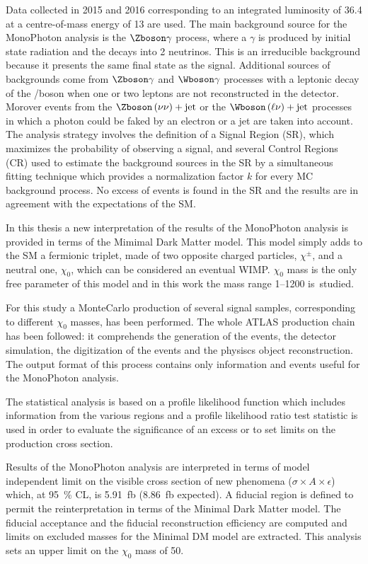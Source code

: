 \documentclass[a4paper,11pt]{article}
\newcommand{\mph}{MonoPhoton }
\newcommand{\cm}{centre-of-mass }
\newcommand{\chizero}{$\chi_0$ }
\begin{document}
Data collected in 2015 and 2016 corresponding to an integrated luminosity of \SI{36.4}{\ifb} at a \cm energy of \SI{13}{\tev} are used. The main background source for the \mph analysis is the $\Zboson\gamma$ process, where a $\gamma$ is produced by initial state radiation and the \Zboson decays into 2 neutrinos. This is an irreducible background because it presents the same final state as the signal. Additional sources of backgrounds come from $\Zboson\gamma$ and $\Wboson\gamma$ processes with a leptonic decay of the \Zboson/\Wboson boson when one or two leptons are not reconstructed in the detector. Morover events from the $\Zboson\left(\nu\nu\right)+\text{jet}$ or the $\Wboson\left(\ell\nu\right)+\text{jet}$ processes in which a photon could be faked by an electron or a jet are taken into account. The analysis strategy involves the definition of a Signal Region (SR), which maximizes the probability of observing a signal, and several Control Regions (CR) used to estimate the background sources in the SR by a simultaneous fitting technique which provides a normalization factor $k$ for every MC background process. No excess of events is found in the SR and the results are in agreement with the expectations of the SM.

In this thesis a new interpretation of the results of the \mph analysis is provided in terms of the Mimimal Dark Matter model. This model simply adds to the SM a fermionic triplet, made of two opposite charged particles, $\chi^\pm$, and a neutral one, $\chi_0$, which can be considered an eventual WIMP. \chizero mass is the only free parameter of this model and in this work the mass range \SIrange{1}{1200}{\gev} \mbox{is studied}.

  
For this study a MonteCarlo production of several signal samples, \mbox{corresponding} to different \chizero masses, has been performed. The whole ATLAS production chain has been followed: it comprehends the generation of the events, the detector simulation, the digitization of the events and the physiscs object reconstruction. The output format of this process contains only information and events useful for the \mph analysis. 

The statistical analysis is based on a profile likelihood function which includes information from the various regions and a profile likelihood ratio test statistic is used in order to evaluate the significance of an excess or to set limits on the production cross section.

Results of the \mph analysis are interpreted in terms of model independent limit on the visible cross section of new phenomena ($\sigma\times A\times\epsilon$) which, at \SI{95}{\percent} CL, is \SI{5.91}{fb} (\SI{8.86}{fb} expected). A fiducial region is defined to permit the reinterpretation in terms of the Minimal Dark Matter model. The fiducial acceptance and the fiducial reconstruction efficiency are computed and limits on excluded masses for the Minimal DM model are extracted. This analysis sets an upper limit on the \chizero mass of \SI{50}{\gev}.
\end{document}

